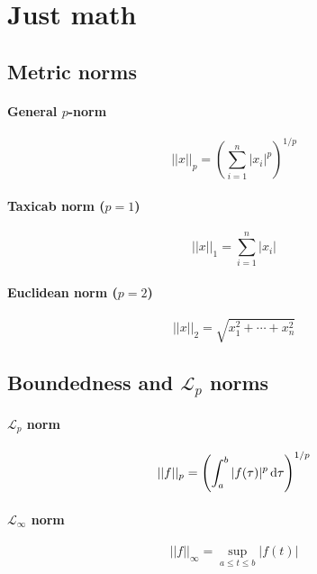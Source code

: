 \section{Just math}

\subsection{Metric norms}
\paragraph{General $p$-norm}
\begin{equation}
	||x||_p
	=
	\left(
		\sum_{i=1}^{n} |x_i|^p
	\right)
	^{1/p}
\end{equation}

\paragraph{Taxicab norm ($p=1$)}
\begin{equation}
	||x||_1
	=
	\sum_{i=1}^{n} |x_i|
\end{equation}

\paragraph{Euclidean norm ($p=2$)}
\begin{equation}
	||x||_2
	=
	\sqrt{x_1^2 + \cdots + x_n^2}
\end{equation}

\subsection{Boundedness and $\mathcal{L}_p$ norms}
\paragraph{$\mathcal{L}_p$ norm}
\begin{equation}
	||f||_p
	=
	\left(
		\int_a^b |f(\tau)|^p \dif \tau
	\right)^{1/p}
\end{equation}

\paragraph{$\mathcal{L}_\infty$ norm}
\begin{equation}
	||f||_\infty
	=
	\sup_{a \leq t \leq b} |f(t)|
\end{equation}

